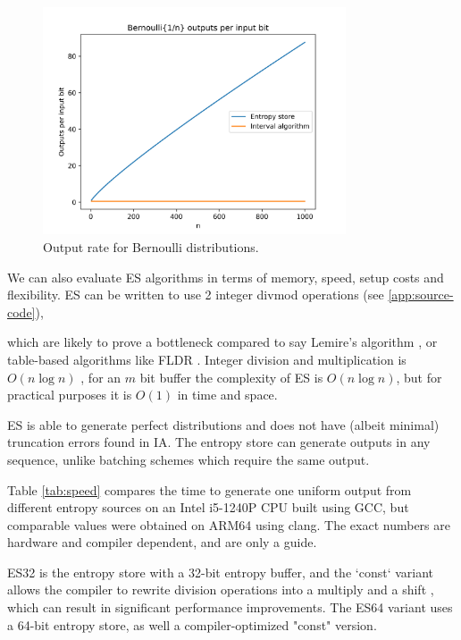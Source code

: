\documentclass[12pt]{article}
\begin{document}
\begin{figure}[ht]
\centering
\includegraphics[width=0.8\textwidth]{bernoulli_rate.png}
\caption{Output rate for Bernoulli distributions.}
\label{fig:bernoulli-rate}
\end{figure}

We can also evaluate ES algorithms in terms of memory, speed, setup costs and flexibility. ES can be written to use 2 integer divmod operations (see \ref{app:source-code}), 

which are likely to prove a bottleneck compared to say Lemire's algorithm \cite{lemire2019fast}, or table-based algorithms like FLDR \cite{saad2020fldr,saad2025}. Integer division and multiplication is $O(n \log n)$ \cite{harvey2021integer}, for an $m$ bit buffer the complexity of ES is $O(n \log n)$, but for practical purposes it is $O(1)$ in time and space.

ES is able to generate perfect distributions and does not have (albeit minimal) truncation errors found in IA. The entropy store can generate  outputs in any sequence, unlike batching schemes which require the same output.

Table \ref{tab:speed} compares the time to generate one uniform output from different entropy sources on an Intel i5-1240P CPU built using GCC, but comparable values were obtained on ARM64 using clang. The exact numbers are hardware and compiler dependent, and are only a guide.

ES32 is the entropy store with a 32-bit entropy buffer, and the `const` variant allows the compiler to rewrite division operations into a multiply and a shift \cite{granlund94}, which can result in significant performance improvements. The ES64 variant uses a 64-bit entropy store, as well a compiler-optimized "const" version.
\end{document}
